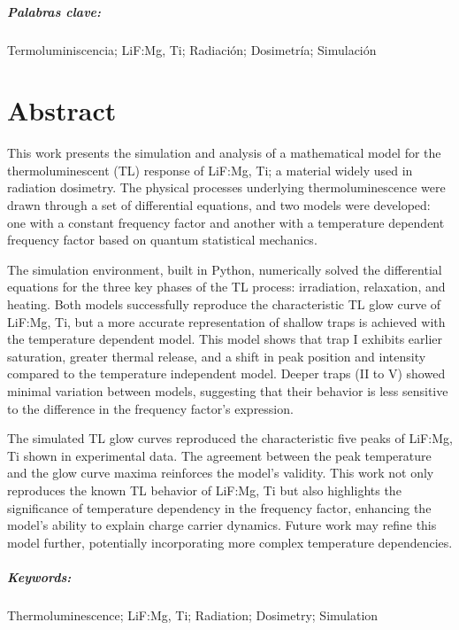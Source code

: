 \paragraph{Palabras clave:} Termoluminiscencia; LiF:Mg, Ti; Radiación; Dosimetría; Simulación









\chapter*{Abstract}

This work presents the simulation and analysis of a mathematical model for the thermoluminescent (TL) response of LiF:Mg, Ti; a material widely used in radiation dosimetry. The physical processes underlying thermoluminescence were drawn through a set of differential equations, and two models were developed: one with a constant frequency factor and another with a temperature dependent frequency factor based on quantum statistical mechanics.

\vspace{10pt}

The simulation environment, built in Python, numerically solved the differential equations for the three key phases of the TL process: irradiation, relaxation, and heating. Both models successfully reproduce the characteristic TL glow curve of LiF:Mg, Ti, but a more accurate representation of shallow traps is achieved with the temperature dependent model. This model shows that trap I exhibits earlier saturation, greater thermal release, and a shift in peak position and intensity compared to the temperature independent model. Deeper traps (II to V) showed minimal variation between models, suggesting that their behavior is less sensitive to the difference in the frequency factor's expression.

\vspace{10pt}

The simulated TL glow curves reproduced the characteristic five peaks of LiF:Mg, Ti shown in experimental data. The agreement between the peak temperature and the glow curve maxima reinforces the model's validity. This work not only reproduces the known TL behavior of LiF:Mg, Ti but also highlights the significance of temperature dependency in the frequency factor, enhancing the model's ability to explain charge carrier dynamics. Future work may refine this model further, potentially incorporating more complex temperature dependencies.

\paragraph{Keywords:} Thermoluminescence; LiF:Mg, Ti; Radiation; Dosimetry; Simulation
